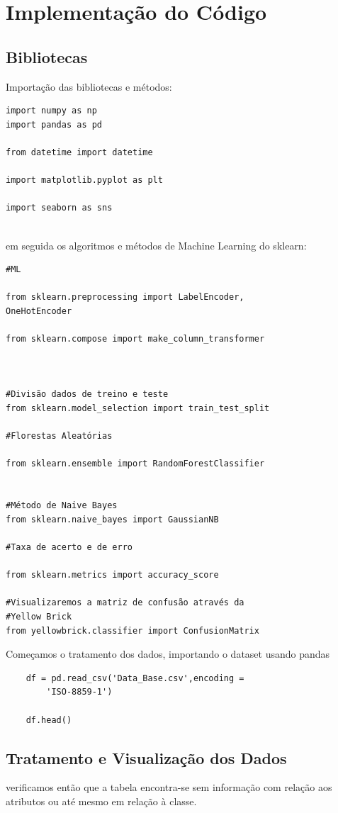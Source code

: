 \documentclass[compress]{beamer}
\begin{document}
\section{Implementação do Código}
\subsection{Bibliotecas}
Importação das bibliotecas e métodos:

\begin{verbatim}
import numpy as np
import pandas as pd

from datetime import datetime

import matplotlib.pyplot as plt

import seaborn as sns


\end{verbatim}

em seguida os algoritmos e métodos de Machine Learning do sklearn:


\begin{verbatim}
#ML

from sklearn.preprocessing import LabelEncoder,
OneHotEncoder

from sklearn.compose import make_column_transformer



#Divisão dados de treino e teste
from sklearn.model_selection import train_test_split

#Florestas Aleatórias

from sklearn.ensemble import RandomForestClassifier


#Método de Naive Bayes
from sklearn.naive_bayes import GaussianNB

#Taxa de acerto e de erro

from sklearn.metrics import accuracy_score

#Visualizaremos a matriz de confusão através da
#Yellow Brick
from yellowbrick.classifier import ConfusionMatrix
\end{verbatim}

Começamos o tratamento dos dados, importando o dataset usando pandas

\begin{verbatim}
    df = pd.read_csv('Data_Base.csv',encoding =
        'ISO-8859-1')
    
    df.head()
\end{verbatim}
\subsection{Tratamento e Visualização dos Dados}
verificamos então que a tabela encontra-se sem informação com relação aos atributos ou até mesmo em relação à classe.
\end{document}
